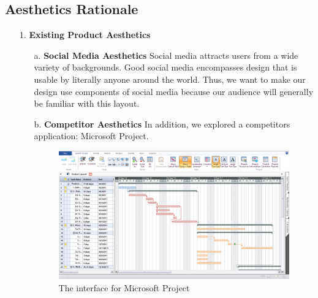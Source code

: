 \begin{enumerate}
\subsection{Aesthetics Rationale}
\begin{enumerate}
\item[1.] \textbf{Existing Product Aesthetics}
\begin{enumerate}
\item[a.] \textbf{Social Media Aesthetics} Social media attracts users from a wide variety of backgrounds. Good social media encompasses design that is usable by literally anyone around the world. Thus, we want to make our design use components of social media because our audience will generally be familiar with this layout.\cite{usability}
\item[b.] \textbf{Competitor Aesthetics} In addition, we explored a competitor\textsc{}s application: Microsoft Project\cite{msproject}.
\FloatBarrier
\begin{figure}[ht]
\includegraphics[width=\textwidth]{msoftp.png}
\caption{The interface for Microsoft Project}
\end{figure}
\FloatBarrier
 

\end{enumerate}
\end{enumerate}
\end{enumerate}

